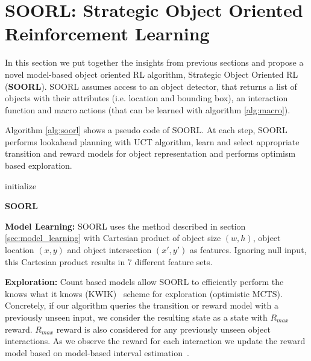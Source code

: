 \section{SOORL: Strategic Object Oriented Reinforcement Learning}
In this section we put together the insights from previous sections and propose a novel model-based object oriented RL algorithm, Strategic Object Oriented RL (\textbf{SOORL}). SOORL assumes access to an object detector, that returns a list of objects with their attributes (i.e. location and bounding box), an interaction function and macro actions (that can be learned with algorithm \ref{alg:macro}).

Algorithm \ref{alg:soorl} shows a pseudo code of SOORL. At each step, SOORL performs lookahead planning with UCT algorithm, learn and select appropriate transition and reward models for object representation and performs optimism based exploration. 

\begin{algorithm}
initialize\;
\caption{{\bf SOORL} \label{alg:soorl}}
\end{algorithm}

\textbf{Model Learning:} SOORL uses the method described in section \ref{sec:model_learning} with Cartesian product of object size $(w,h)$, object location $(x,y)$ and object intersection $(x',y')$ as features. Ignoring null input, this Cartesian product results in 7 different feature sets.

\textbf{Exploration:} Count based models allow SOORL to efficiently perform the knows what it knows (KWIK)~\citep{li2008knows} scheme for exploration (optimistic MCTS). Concretely, if our algorithm queries the transition or reward model with a previously unseen input, we consider the resulting state as a state with $R_{max}$ reward. $R_{max}$ reward is also considered for any previously unseen object interactions. As we observe the reward for each interaction we update the reward model based on model-based interval estimation~\citep{strehl2008analysis}.


